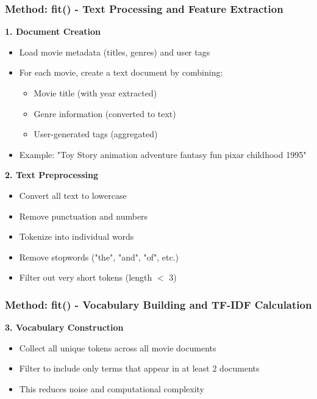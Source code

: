 \documentclass{beamer}
\begin{document}
\begin{frame}
\frametitle{Method: fit() - Text Processing and Feature Extraction}

    \textbf{1. Document Creation}
    \begin{itemize}
        \item Load movie metadata (titles, genres) and user tags
        \item For each movie, create a text document by combining:
        \begin{itemize}
            \item Movie title (with year extracted)
            \item Genre information (converted to text)
            \item User-generated tags (aggregated)
        \end{itemize}
        \item Example: "Toy Story animation adventure fantasy fun pixar childhood 1995"
    \end{itemize}

    \vspace{0.5cm}
    
    \textbf{2. Text Preprocessing}
    \begin{itemize}
        \item Convert all text to lowercase
        \item Remove punctuation and numbers
        \item Tokenize into individual words
        \item Remove stopwords ("the", "and", "of", etc.)
        \item Filter out very short tokens (length $<$ 3)
    \end{itemize}
\end{frame}

\begin{frame}
\frametitle{Method: fit() - Vocabulary Building and TF-IDF Calculation}
    \textbf{3. Vocabulary Construction}
    \begin{itemize}
        \item Collect all unique tokens across all movie documents
        \item Filter to include only terms that appear in at least 2 documents
        \item This reduces noise and computational complexity
    \end{itemize}
\end{frame}
\end{document}
